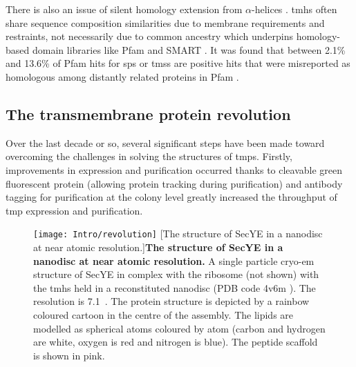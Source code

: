 There is also an issue of silent homology extension from $\alpha$\--helices \cite{Wong2010}.
\gls{tmh}s often share sequence composition similarities due to membrane requirements and restraints, not necessarily due to common ancestry which underpins homology\--based domain libraries like Pfam \cite{Finn2016} and SMART \cite{Letunic2012}.
It was found that between 2.1\% and 13.6\% of Pfam hits for \gls{sp}s or \gls{tms}s are positive hits that were misreported as homologous among distantly related proteins in Pfam \cite{Wong2010}.

\subsection{The transmembrane protein revolution}\label{section:revolution}
Over the last decade or so, several significant steps have been made toward overcoming the challenges in solving the structures of \gls{tmp}s.
Firstly, improvements in expression and purification occurred thanks to cleavable green fluorescent protein (allowing protein tracking during purification) \cite{Drew2005, Kawate2006} and antibody tagging for purification \cite{Eshaghi2005} at the colony level \cite{Cornvik2005} greatly increased the throughput of \gls{tmp} expression and purification.

\begin{figure}[ht!]
\centering
\texttt{[image: Intro/revolution]}
		[The structure of SecYE in a nanodisc at near atomic resolution.]{\textbf{The structure of SecYE in a nanodisc at near atomic resolution.}
		A single particle cryo\--\gls{em} structure of SecYE in complex with the ribosome (not shown) with the \gls{tmh}s held in a reconstituted nanodisc (PDB code 4v6m \cite{Frauenfeld2011}).
		The resolution is 7.1~\angstrom.
		The protein structure is depicted by a rainbow coloured cartoon in the centre of the assembly.
		The lipids are modelled as spherical atoms coloured by atom (carbon and hydrogen are white, oxygen is red and nitrogen is blue).
		The peptide scaffold is shown in pink.
		}

\label{fig:revolution}
\end{figure}

